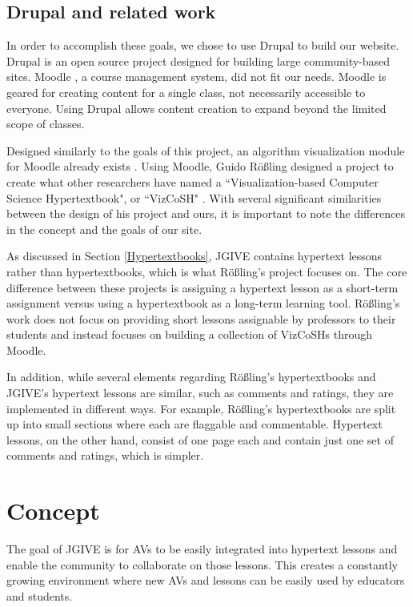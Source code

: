 \documentclass{acm_proc_article-sp}
\begin{document}
\subsection{Drupal and related work}
In order to accomplish these goals, we chose to use Drupal to build our website. Drupal is an open source project designed for building large community-based sites. Moodle \cite{moodle}, a course management system, did not fit our needs. Moodle is geared for creating content for a single class, not necessarily accessible to everyone. Using Drupal allows content creation to expand beyond the limited scope of classes.

Designed similarly to the goals of this project, an algorithm visualization module for Moodle already exists \cite{moodlemodule}. Using Moodle, Guido R\"o\ss ling designed a project to create what other researchers have named a ``Visualization-based Computer Science Hypertextbook", or ``VizCoSH" \cite{vizcosh}. With several significant similarities between the design of his project and ours, it is important to note the differences in the concept and the goals of our site.

As discussed in Section \ref{Hypertextbooks}, JGIVE contains hypertext lessons rather than hypertextbooks, which is what R\"o\ss ling's project focuses on. The core difference between these projects is assigning a hypertext lesson as a short-term assignment versus using a hypertextbook as a long-term learning tool. R\"o\ss ling's work does not focus on providing short lessons assignable by professors to their students and instead focuses on building a collection of VizCoSHs through Moodle. 

In addition, while several elements regarding R\"o\ss ling's hypertextbooks and JGIVE's hypertext lessons are similar, such as comments and ratings, they are implemented in different ways. For example, R\"o\ss ling's hypertextbooks are split up into small sections where each are flaggable and commentable. Hypertext lessons, on the other hand, consist of one page each and contain just one set of comments and ratings, which is simpler.

\section{Concept}
The goal of JGIVE is for AVs to be easily integrated into hypertext lessons and enable the community to collaborate on those lessons. This creates a constantly growing environment where new AVs and lessons can be easily used by educators and students.
\end{document}
